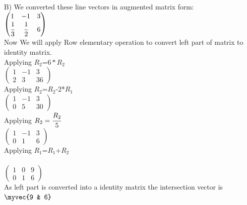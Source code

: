 B)
We converted these line vectors in augmented matrix form:\\ 

$\begin{pmatrix}
1 & -1 & 3\\
\cfrac{1}{3} & \cfrac{1}{2} & 6
\end{pmatrix}$\\
 

Now We will apply Row elementary operation to convert left part of matrix to identity matrix.\\

Applying $R_{2}$=$6*R_{2}$\\

$\begin{pmatrix}
1 & -1 & 3\\
2 & 3 & 36
\end{pmatrix}$\\

Applying $R_{2}$=$R_{2}$-2*$R_{1}$\\

$\begin{pmatrix}
1 & -1 & 3\\
0 & 5 & 30
\end{pmatrix}$\\

Applying $R_{2}=\cfrac{R_{2}}{5}$\\

$\begin{pmatrix}
1 & -1 & 3\\
0 & 1 & 6
\end{pmatrix}$\\

Applying $R_{1}$=$R_{1}$+$R_{2}$\\\\

$\begin{pmatrix}
1 & 0 & 9\\
0 & 1 & 6
\end{pmatrix}$\\

As left part is converted into a identity matrix the intersection vector is $\myvec{9 & 6}$\\

